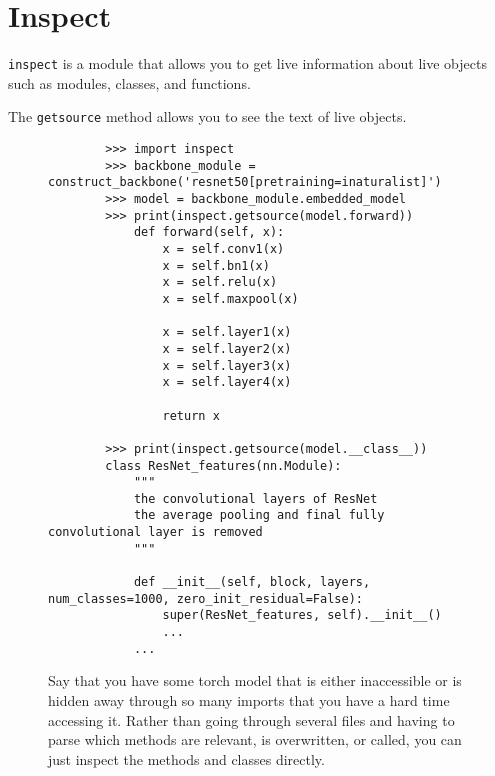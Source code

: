 \section{Inspect} 

  \texttt{inspect} is a module that allows you to get live information about live objects such as modules, classes, and functions. 

  
  \begin{definition}
    The \texttt{getsource} method allows you to see the text of live objects. 

    \begin{figure}[H]
      \centering 
      \begin{lstlisting}
        >>> import inspect 
        >>> backbone_module = construct_backbone('resnet50[pretraining=inaturalist]')
        >>> model = backbone_module.embedded_model 
        >>> print(inspect.getsource(model.forward))
            def forward(self, x):
                x = self.conv1(x)
                x = self.bn1(x)
                x = self.relu(x)
                x = self.maxpool(x)

                x = self.layer1(x)
                x = self.layer2(x)
                x = self.layer3(x)
                x = self.layer4(x)

                return x

        >>> print(inspect.getsource(model.__class__))
        class ResNet_features(nn.Module):
            """
            the convolutional layers of ResNet
            the average pooling and final fully convolutional layer is removed
            """

            def __init__(self, block, layers, num_classes=1000, zero_init_residual=False):
                super(ResNet_features, self).__init__()
                ...
            ...
      \end{lstlisting}
      \caption{Say that you have some torch model that is either inaccessible or is hidden away through so many imports that you have a hard time accessing it. Rather than going through several files and having to parse which methods are relevant, is overwritten, or called, you can just inspect the methods and classes directly.}
    \end{figure}
  \end{definition}
